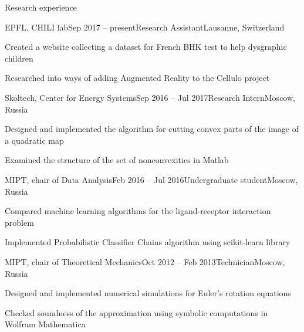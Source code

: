 \documentclass{resume} %
\begin{document}
\begin{rSection}{Research experience}
	\begin{rSubsection}{EPFL, CHILI lab}{Sep 2017 -- present}{Research Assistant}{Lausanne, Switzerland}
		\item Created a website collecting a dataset for French BHK test to help dysgraphic children
		\item Researched into ways of adding Augmented Reality to the Cellulo project
	\end{rSubsection}
	
	\begin{rSubsection}{Skoltech, Center for Energy Systems}{Sep 2016 -- Jul 2017}{Research Intern}{Moscow, Russia}
		\item Designed and implemented the algorithm for cutting convex parts of the image of a quadratic map
		\item Examined the structure of the set of nonconvexities in Matlab
	\end{rSubsection}
	
	\begin{rSubsection}{MIPT, chair of Data Analysis}{Feb 2016 -- Jul 2016}{Undergraduate student}{Moscow, Russia}
		\item Compared machine learning algorithms for the ligand-receptor interaction problem
		\item Implemented Probabilistic Classifier Chains algorithm using scikit-learn library
	\end{rSubsection}
	
	\begin{rSubsection}{MIPT, chair of Theoretical Mechanics}{Oct 2012 -- Feb 2013}{Technician}{Moscow, Russia}
		\item Designed and implemented numerical simulations for Euler's rotation equations
		\item Checked soundness of the approximation using symbolic computations in Wolfram Mathematica
	\end{rSubsection}
\end{rSection}
\end{document}
